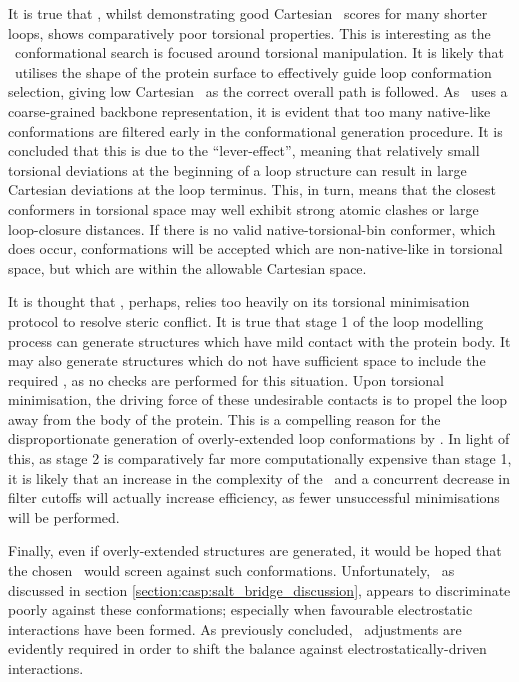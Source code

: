  


It is true that \prearcus, whilst demonstrating good Cartesian \crms\ scores for many shorter loops, shows comparatively poor torsional properties. This is interesting as  the \prearcus\ conformational search is focused around torsional manipulation. It is likely that \prearcus\ utilises the shape of the protein surface to effectively guide loop conformation selection, giving low Cartesian \crms\ as the correct overall path is followed. As \prearcus\ uses a coarse-grained backbone representation, it is evident that too many native-like conformations are filtered early in the conformational generation procedure.
It is concluded that this is due to the ``lever-effect'', meaning that relatively small torsional deviations at the beginning of a loop structure can result in large Cartesian deviations at the loop terminus. This, in turn, means that the closest conformers in torsional space may well exhibit strong atomic clashes or large loop-closure distances. If there is no valid native-torsional-bin conformer, which does occur, conformations will be accepted which are non-native-like in torsional space, but which are within the allowable Cartesian space. 

 It is thought that \prearcus, perhaps, relies too heavily on its torsional minimisation protocol to resolve steric conflict. It is true that stage 1 of the loop modelling process can generate structures which have mild contact with the protein body. It may also generate structures which do not have sufficient space to include the required \sidechains, as no checks are performed for this situation. Upon torsional minimisation, the driving force of these undesirable contacts is to propel the loop away from the body of the protein. This is a compelling reason for the disproportionate generation of overly-extended loop conformations by \prearcus.
In light of this, as stage 2 is comparatively far more computationally expensive than stage 1, it is likely that an increase in the complexity of the \angleset\ and a concurrent decrease in filter cutoffs will actually increase efficiency, as fewer unsuccessful minimisations will be performed.

Finally, even if overly-extended structures are generated, it would be hoped that the chosen \forcefield\ would screen against such conformations. Unfortunately, \amberwgbsa\ as discussed in section \ref{section:casp:salt_bridge_discussion}, appears to discriminate poorly against these conformations; especially when favourable electrostatic interactions have been formed. As previously concluded, \forcefield\ adjustments are evidently required in order to shift the balance against electrostatically-driven interactions.


